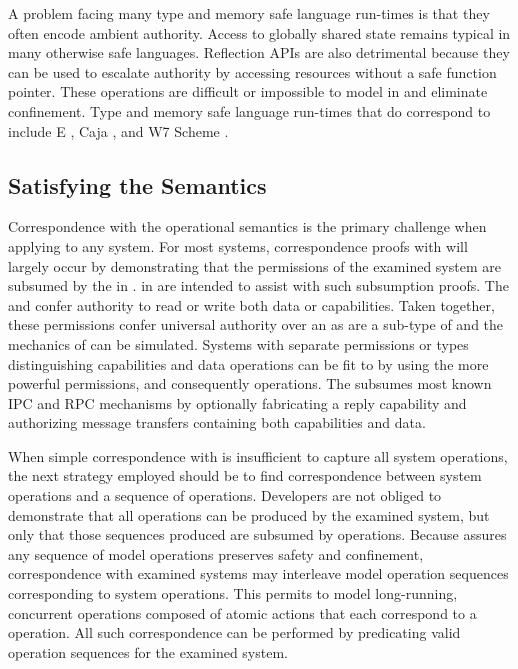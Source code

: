 A problem facing many type and memory safe language run-times is that they often encode ambient authority.
Access to globally shared state remains typical in many otherwise safe languages.
Reflection APIs are also detrimental because they can be used to escalate authority by accessing resources without a safe function pointer.
These operations are difficult or impossible to model in \TMmodelName{} and eliminate confinement.
Type and memory safe language run-times that do correspond to \TMmodelName{} include E \cite{RobustComposition}, Caja \cite{caja}, and W7 Scheme \cite{Rees96asecurity}.

\subsection{Satisfying the Semantics}

Correspondence with the operational semantics is the primary challenge when applying \TMmodelName{} to any system.
For most systems, correspondence proofs with \TMmodelName{} will largely occur by demonstrating that the permissions of the examined system are subsumed by the \TMaccessRights{} in \TMmodelName{}.
\xmakefirstuc{\TMaccessRights} in \TMmodelName{} are intended to assist with such subsumption proofs.
The \NMrd{} and \NMwr{} \TMaccessRights{} confer authority to read or write both data or capabilities.
Taken together, these permissions confer universal authority over an \TMobj{} as \NMwk{} \TMaccessRights{} are a sub-type of \NMrd{} and the mechanics of \NMtx{} can be simulated.
Systems with separate permissions or \TMobj{} types distinguishing capabilities and data operations can be fit to \TMmodelName{} by using the more powerful permissions, and consequently operations.
The \NMtx{} \TMaccessRight{} subsumes most known IPC and RPC mechanisms by optionally fabricating a reply capability and authorizing message transfers containing both capabilities and data.


When simple correspondence with \TMaccessRights{} is insufficient to capture all system operations, the next strategy employed should be to find correspondence between system operations and a sequence of \TMmodelName{} operations.
Developers are not obliged to demonstrate that all \TMmodelName{} operations can be produced by the examined system, but only that those sequences produced are subsumed by \TMmodelName{} operations.
Because \TMmodelName{} assures any sequence of model operations preserves safety and confinement, correspondence with examined systems may interleave model operation sequences corresponding to system operations.
This permits \TMmodelName{} to model long-running, concurrent operations composed of atomic actions that each correspond to a \TMmodelName{} operation.
All such correspondence can be performed by predicating valid operation sequences for the examined system.

